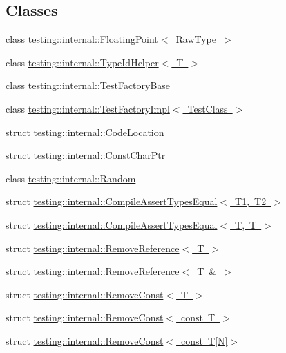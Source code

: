 \subsection*{Classes}
\begin{DoxyCompactItemize}
\item 
class \mbox{\hyperlink{classtesting_1_1internal_1_1FloatingPoint}{testing\+::internal\+::\+Floating\+Point$<$ Raw\+Type $>$}}
\item 
class \mbox{\hyperlink{classtesting_1_1internal_1_1TypeIdHelper}{testing\+::internal\+::\+Type\+Id\+Helper$<$ T $>$}}
\item 
class \mbox{\hyperlink{classtesting_1_1internal_1_1TestFactoryBase}{testing\+::internal\+::\+Test\+Factory\+Base}}
\item 
class \mbox{\hyperlink{classtesting_1_1internal_1_1TestFactoryImpl}{testing\+::internal\+::\+Test\+Factory\+Impl$<$ Test\+Class $>$}}
\item 
struct \mbox{\hyperlink{structtesting_1_1internal_1_1CodeLocation}{testing\+::internal\+::\+Code\+Location}}
\item 
struct \mbox{\hyperlink{structtesting_1_1internal_1_1ConstCharPtr}{testing\+::internal\+::\+Const\+Char\+Ptr}}
\item 
class \mbox{\hyperlink{classtesting_1_1internal_1_1Random}{testing\+::internal\+::\+Random}}
\item 
struct \mbox{\hyperlink{structtesting_1_1internal_1_1CompileAssertTypesEqual}{testing\+::internal\+::\+Compile\+Assert\+Types\+Equal$<$ T1, T2 $>$}}
\item 
struct \mbox{\hyperlink{structtesting_1_1internal_1_1CompileAssertTypesEqual_3_01T_00_01T_01_4}{testing\+::internal\+::\+Compile\+Assert\+Types\+Equal$<$ T, T $>$}}
\item 
struct \mbox{\hyperlink{structtesting_1_1internal_1_1RemoveReference}{testing\+::internal\+::\+Remove\+Reference$<$ T $>$}}
\item 
struct \mbox{\hyperlink{structtesting_1_1internal_1_1RemoveReference_3_01T_01_6_01_4}{testing\+::internal\+::\+Remove\+Reference$<$ T \& $>$}}
\item 
struct \mbox{\hyperlink{structtesting_1_1internal_1_1RemoveConst}{testing\+::internal\+::\+Remove\+Const$<$ T $>$}}
\item 
struct \mbox{\hyperlink{structtesting_1_1internal_1_1RemoveConst_3_01const_01T_01_4}{testing\+::internal\+::\+Remove\+Const$<$ const T $>$}}
\item 
struct \mbox{\hyperlink{structtesting_1_1internal_1_1RemoveConst_3_01const_01T[N]_4}{testing\+::internal\+::\+Remove\+Const$<$ const T\mbox{[}\+N\mbox{]}$>$}}

\end{DoxyCompactItemize}
